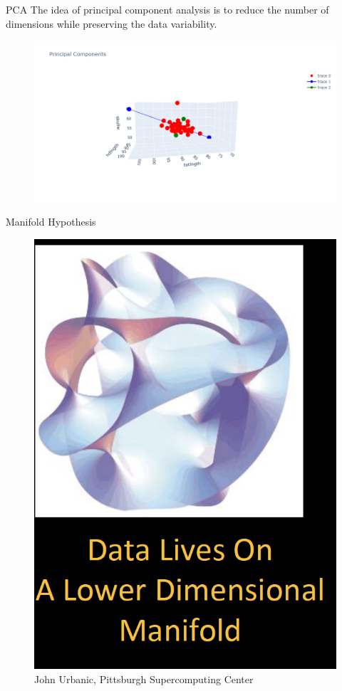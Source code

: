 \documentclass[11pt, aspectratio=43]{beamer}
\begin{document}
\begin{frame}{PCA}
	The idea of principal component analysis is to reduce the number of dimensions while preserving the data variability. 
	\begin{figure}[h]
		\centering
		\includegraphics[scale=0.35]{Figures/3d_2pc.png}
	\end{figure}			
	
\end{frame}


\begin{frame}{Manifold Hypothesis}
		\begin{figure}[h]
		\centering
		\includegraphics[scale=0.4]{Figures/manifold_hyp.png}
		\caption{John Urbanic, Pittsburgh Supercomputing Center}
	\end{figure}
\end{frame}
\end{document}
